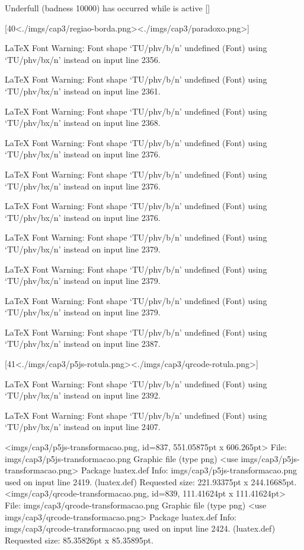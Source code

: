 Underfull \vbox (badness 10000) has occurred while \output is active []

[40<./imgs/cap3/regiao-borda.png><./imgs/cap3/paradoxo.png>]

LaTeX Font Warning: Font shape `TU/phv/b/n' undefined
(Font)              using `TU/phv/bx/n' instead on input line 2356.


LaTeX Font Warning: Font shape `TU/phv/b/n' undefined
(Font)              using `TU/phv/bx/n' instead on input line 2361.


LaTeX Font Warning: Font shape `TU/phv/b/n' undefined
(Font)              using `TU/phv/bx/n' instead on input line 2368.


LaTeX Font Warning: Font shape `TU/phv/b/n' undefined
(Font)              using `TU/phv/bx/n' instead on input line 2376.


LaTeX Font Warning: Font shape `TU/phv/b/n' undefined
(Font)              using `TU/phv/bx/n' instead on input line 2376.


LaTeX Font Warning: Font shape `TU/phv/b/n' undefined
(Font)              using `TU/phv/bx/n' instead on input line 2376.


LaTeX Font Warning: Font shape `TU/phv/b/n' undefined
(Font)              using `TU/phv/bx/n' instead on input line 2379.


LaTeX Font Warning: Font shape `TU/phv/b/n' undefined
(Font)              using `TU/phv/bx/n' instead on input line 2379.


LaTeX Font Warning: Font shape `TU/phv/b/n' undefined
(Font)              using `TU/phv/bx/n' instead on input line 2379.


LaTeX Font Warning: Font shape `TU/phv/b/n' undefined
(Font)              using `TU/phv/bx/n' instead on input line 2387.

[41<./imgs/cap3/p5js-rotula.png><./imgs/cap3/qrcode-rotula.png>]

LaTeX Font Warning: Font shape `TU/phv/b/n' undefined
(Font)              using `TU/phv/bx/n' instead on input line 2392.


LaTeX Font Warning: Font shape `TU/phv/b/n' undefined
(Font)              using `TU/phv/bx/n' instead on input line 2407.

<imgs/cap3/p5js-transformacao.png, id=837, 551.05875pt x 606.265pt>
File: imgs/cap3/p5js-transformacao.png Graphic file (type png)
<use imgs/cap3/p5js-transformacao.png>
Package luatex.def Info: imgs/cap3/p5js-transformacao.png  used on input line 2419.
(luatex.def)             Requested size: 221.93375pt x 244.16685pt.
<imgs/cap3/qrcode-transformacao.png, id=839, 111.41624pt x 111.41624pt>
File: imgs/cap3/qrcode-transformacao.png Graphic file (type png)
<use imgs/cap3/qrcode-transformacao.png>
Package luatex.def Info: imgs/cap3/qrcode-transformacao.png  used on input line 2424.
(luatex.def)             Requested size: 85.35826pt x 85.35895pt.

